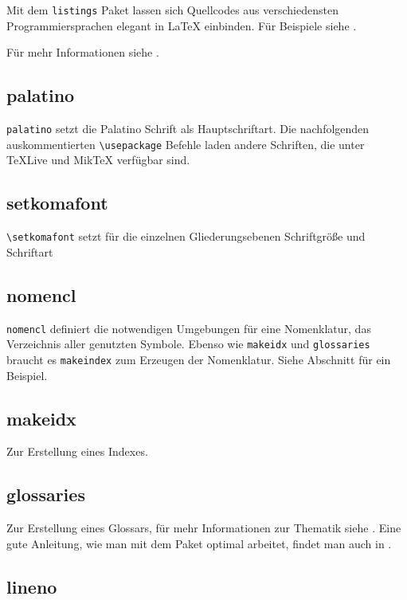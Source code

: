Mit dem \texttt{listings} Paket lassen sich Quellcodes aus verschiedensten Programmiersprachen elegant in \LaTeX{} einbinden. Für Beispiele siehe .

Für mehr Informationen siehe \cite{listings}.


\subsection{palatino}

\texttt{palatino} setzt die Palatino Schrift als Hauptschriftart. Die nachfolgenden auskommentierten \verb|\usepackage| Befehle laden andere Schriften, die unter \TeX Live und Mik\TeX{} verfügbar sind.

\subsection{setkomafont} 

\verb|\setkomafont| setzt für die einzelnen Gliederungsebenen Schriftgröße und Schriftart

\subsection{nomencl}

\texttt{nomencl} definiert die notwendigen Umgebungen für eine Nomenklatur, das Verzeichnis aller genutzten Symbole. Ebenso wie \texttt{makeidx} und \texttt{glossaries} braucht es \texttt{makeindex} zum Erzeugen der Nomenklatur. Siehe Abschnitt  für ein Beispiel.

\subsection{makeidx}

Zur Erstellung eines Indexes.

\subsection{glossaries}

Zur Erstellung eines Glossars, für mehr Informationen zur Thematik siehe \cite{glossaries}. Eine gute Anleitung, wie man mit dem Paket optimal arbeitet, findet man auch in \cite{tut:glossaries}.


\subsection{lineno}

